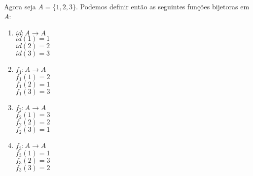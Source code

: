 \documentclass{beamer}
\begin{document}
    \begin{frame}
        Agora seja $A = \{1, 2, 3\}$. Podemos definir ent\~ao as seguintes fun\c{c}\~oes bijetoras em $A$:
        \begin{multicols}{3}
            \begin{enumerate}
                \item[] \begin{center}
                    $id : A \to A$\\
                    $id(1) = 1$\\
                    $id(2) = 2$\\
                    $id(3) = 3$
                \end{center}\pause

                \vspace{.3cm}

                \item[] \begin{center}
                    $f_1 : A \to A$\pause\\
                    $f_1(1) = 2$\pause\\
                    $f_1(2) = 1$\pause\\
                    $f_1(3) = 3$
                \end{center}\pause

                \vspace{.3cm}

                \item[] \begin{center}
                    $f_2 : A \to A$\pause\\
                    $f_2(1) = 3$\pause\\
                    $f_2(2) = 2$\pause\\
                    $f_2(3) = 1$
                \end{center}\pause

                \vspace{.3cm}

                \item[] \begin{center}
                    $f_3 : A \to A$\pause\\
                    $f_3(1) = 1$\pause\\
                    $f_3(2) = 3$\pause\\
                    $f_3(3) = 2$
                \end{center}\pause


\end{enumerate}
\end{multicols}
\end{frame}
\end{document}
